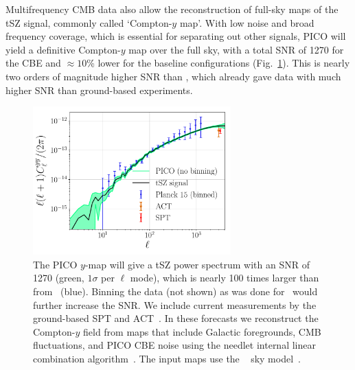 \documentclass[PICOReport.tex]{subfiles}
\begin{document}

Multifrequency \ac{CMB} data also allow the reconstruction of full-sky maps of the tSZ signal, commonly called  \lq Compton-$y$ map\rq. With low noise and broad frequency coverage, which is essential for separating out other signals, PICO will yield a definitive Compton-$y$ map over the full sky, with a total \ac{SNR} of 1270 for the CBE and $\approx 10$\% lower for the baseline configurations (Fig.~\ref{fig:PICO_tSZ_PS}). This is nearly two orders of magnitude higher \ac{SNR} than \planck , which already gave data with much higher \ac{SNR} than ground-based experiments. 

\begin{figure}
\hspace{-0.1in}
\parbox{3.1in}{\centerline{
\includegraphics[width=3.0in]{images/PICO_tSZ_PS_plot.pdf} } }
\hspace{0.in}
\parbox{3.4in}{
\caption{\captiontext  
The PICO $y$-map will give a tSZ power spectrum with an \ac{SNR} of 1270 (green, $1\sigma$ per $\ell$ mode), which is nearly 100 times larger than from \planck\ (blue). Binning the data (not shown) as was done for \planck\ would further increase the \ac{SNR}.  We include current measurements by the ground-based SPT and ACT~\citep{Sievers2013,George2015}. In these forecasts we reconstruct the Compton-$y$ field from maps that include Galactic foregrounds, CMB fluctuations, and PICO CBE noise using the needlet internal linear combination algorithm~\citep{Delabrouille2009}. The input maps use the \planck~ sky model~\cite{psm?}.
\label{fig:PICO_tSZ_PS} 
} }
\vspace{-0.1in}
\end{figure}
\end{document}
